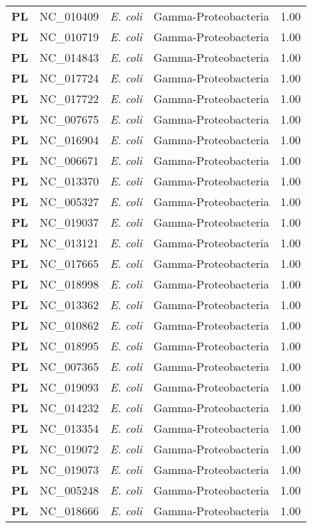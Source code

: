 \begin{adjustwidth}{-3cm}{2cm}
{\begin{supertabular}{>{\bfseries}l|p{0.1\textwidth}p{0.14\textwidth}l|l}
PL & NC\_010409 & \textit{E. coli} & Gamma-Proteobacteria & 1.00\\
PL & NC\_010719 & \textit{E. coli} & Gamma-Proteobacteria & 1.00\\
PL & NC\_014843 & \textit{E. coli} & Gamma-Proteobacteria & 1.00\\
PL & NC\_017724 & \textit{E. coli} & Gamma-Proteobacteria & 1.00\\
PL & NC\_017722 & \textit{E. coli} & Gamma-Proteobacteria & 1.00\\
PL & NC\_007675 & \textit{E. coli} & Gamma-Proteobacteria & 1.00\\
PL & NC\_016904 & \textit{E. coli} & Gamma-Proteobacteria & 1.00\\
PL & NC\_006671 & \textit{E. coli} & Gamma-Proteobacteria & 1.00\\
PL & NC\_013370 & \textit{E. coli} & Gamma-Proteobacteria & 1.00\\
PL & NC\_005327 & \textit{E. coli} & Gamma-Proteobacteria & 1.00\\
PL & NC\_019037 & \textit{E. coli} & Gamma-Proteobacteria & 1.00\\
PL & NC\_013121 & \textit{E. coli} & Gamma-Proteobacteria & 1.00\\
PL & NC\_017665 & \textit{E. coli} & Gamma-Proteobacteria & 1.00\\
PL & NC\_018998 & \textit{E. coli} & Gamma-Proteobacteria & 1.00\\
PL & NC\_013362 & \textit{E. coli} & Gamma-Proteobacteria & 1.00\\
PL & NC\_010862 & \textit{E. coli} & Gamma-Proteobacteria & 1.00\\
PL & NC\_018995 & \textit{E. coli} & Gamma-Proteobacteria & 1.00\\
PL & NC\_007365 & \textit{E. coli} & Gamma-Proteobacteria & 1.00\\
PL & NC\_019093 & \textit{E. coli} & Gamma-Proteobacteria & 1.00\\
PL & NC\_014232 & \textit{E. coli} & Gamma-Proteobacteria & 1.00\\
PL & NC\_013354 & \textit{E. coli} & Gamma-Proteobacteria & 1.00\\
PL & NC\_019072 & \textit{E. coli} & Gamma-Proteobacteria & 1.00\\
PL & NC\_019073 & \textit{E. coli} & Gamma-Proteobacteria & 1.00\\
PL & NC\_005248 & \textit{E. coli} & Gamma-Proteobacteria & 1.00\\
PL & NC\_018666 & \textit{E. coli} & Gamma-Proteobacteria & 1.00\\

\end{supertabular}}
\end{adjustwidth}
